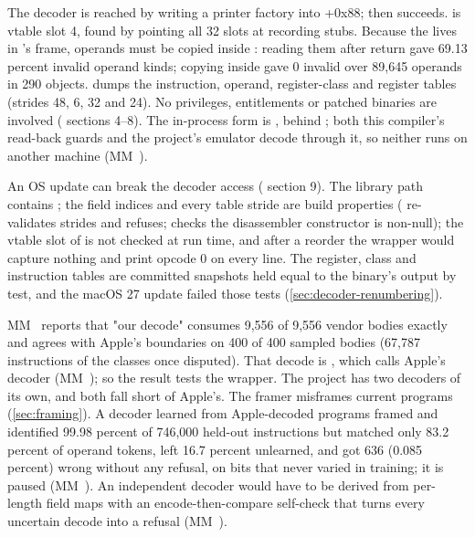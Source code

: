 The decoder is reached by writing a printer factory into +0x88;  then succeeds.  is vtable slot 4,
found by pointing all 32 slots at recording stubs. Because the  lives in 's frame, operands must
be copied inside : reading them after return gave 69.13 percent invalid operand kinds; copying inside gave 0
invalid over 89,645 operands in 290 objects.  dumps the instruction,
operand, register-class and register tables (strides 48, 6, 32 and 24). No privileges, entitlements or patched binaries
are involved ( sections 4–8). The in-process form is , behind
; both this compiler's read-back guards and the project's emulator decode through it, so neither
runs on another machine (MM~).

An OS update can break the decoder access ( section 9). The library path contains ; the
 field indices and every table stride are build properties ( re-validates strides and refuses;
 checks the disassembler constructor is non-null); the vtable slot of  is not checked at run time,
and after a reorder the wrapper would capture nothing and print opcode 0 on every line. The register, class and instruction tables are
committed snapshots held equal to the binary's output by test, and the macOS 27 update failed those tests
(\cref{sec:decoder-renumbering}).

MM~ reports that "our decode" consumes 9,556 of 9,556 vendor bodies exactly and
agrees with Apple's boundaries on 400 of 400 sampled bodies (67,787 instructions of the classes once disputed). That
decode is , which calls Apple's decoder (MM~); so the result tests the wrapper. The
project has two decoders of its own, and both fall short of Apple's. The framer misframes current
programs (\cref{sec:framing}). A decoder learned from Apple-decoded programs framed and identified 99.98 percent of 746,000
held-out instructions but matched only 83.2 percent of operand tokens, left 16.7 percent unlearned, and got 636 (0.085
percent) wrong without any refusal, on bits that never varied in training; it is paused (MM~). An independent
decoder would have to be derived from per-length field maps with an encode-then-compare self-check that turns every uncertain decode into a
refusal (MM~).

